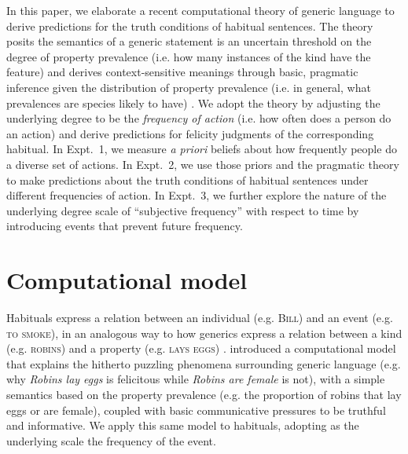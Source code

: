 \documentclass[10pt,letterpaper]{article}
\begin{document}
In this paper, we elaborate a recent computational theory of generic language to derive predictions for the truth conditions of habitual sentences. 
The theory posits the semantics of a generic statement is an uncertain threshold on the degree of property prevalence (i.e. how many instances of the kind have the feature) and derives context-sensitive meanings through basic, pragmatic inference given the distribution of property prevalence (i.e. in general, what prevalences are species likely to have) \cite{TesslerUnderReview}.
We adopt the theory by adjusting the underlying degree to be the \emph{frequency of action} (i.e. how often does a person do an action) and derive predictions for felicity judgments of the corresponding habitual.
In Expt.~1, we measure \emph{a priori} beliefs about how frequently people do a diverse set of actions.
In Expt.~2, we use those priors and the pragmatic theory to make predictions about the truth conditions of habitual sentences under different frequencies of action. 
In Expt.~3, we further explore the nature of the underlying degree scale of ``subjective frequency'' with respect to time by introducing events that prevent future frequency. 

\section{Computational model}

Habituals express a relation between an individual (e.g. \textsc{Bill}) and an event (e.g. \textsc{to smoke}), in an analogous way to how generics express a relation between a kind (e.g. \textsc{robins}) and a property (e.g. \textsc{lays eggs}) \cite{Carlson1995}. 
 introduced a computational model that explains the hitherto puzzling phenomena surrounding generic language (e.g. why \emph{Robins lay eggs} is felicitous while \emph{Robins are female} is not), with a simple semantics based on the property prevalence (e.g. the proportion of robins that lay eggs or are female), coupled with basic communicative pressures to be truthful and informative. 
We apply this same model to habituals, adopting as the underlying scale the frequency of the event.
 
\end{document}
